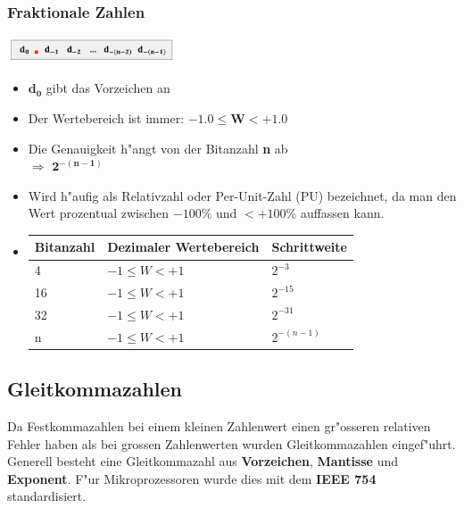 %
\begin{minipage}{0.5cm}
	\ \
\end{minipage}
%
\begin{minipage}[t]{9cm}
	\subsubsection{Fraktionale Zahlen}
		\includegraphics[width=5cm]{pics/Fraktionale_Zahlen}
		\begin{itemize}
			\item $\mathbf{d_0}$ gibt das Vorzeichen an
			\item Der Wertebereich ist immer: \color{blue} $\mathbf{-1.0 \leq W < +1.0}$ \color{black}
			\item Die Genauigkeit h"angt von der Bitanzahl \textbf{n} ab 
				\\$\Rightarrow$ \color{blue} $\mathbf{2^{-(n-1)}}$ \color{black}
			\item Wird h"aufig als Relativzahl oder Per-Unit-Zahl (PU) bezeichnet, da man den Wert prozentual zwischen $-100\%$ und $<+100\%$ auffassen kann.
			\item \begin{tabular}{|l|l|l|}
					\hline
					\rowcolor[HTML]{C0C0C0} 
					Bitanzahl & Dezimaler Wertebereich         & Schrittweite                  \\ \hline
					\rowcolor[HTML]{EFEFEF} 
					4         & $-1 \leq W <+1$ & $2^{-3}$     \\ \hline
					\rowcolor[HTML]{EFEFEF} 
					16        & $-1 \leq W <+1$ & $2^{-15}$    \\ \hline
					\rowcolor[HTML]{EFEFEF} 
					32        & $-1 \leq W <+1$ & $2^{-31}$ \\ \hline
					\rowcolor[HTML]{EFEFEF} 
					n         & $-1 \leq W <+1$ & $2^{-(n-1)}$ \\ \hline		
				\end{tabular}				
		\end{itemize}
\end{minipage}

\subsection{Gleitkommazahlen}
Da Festkommazahlen bei einem kleinen Zahlenwert einen gr"osseren relativen Fehler haben als bei grossen Zahlenwerten wurden Gleitkommazahlen eingef"uhrt. Generell besteht eine Gleitkommazahl aus \textbf{Vorzeichen}, \textbf{Mantisse} und \textbf{Exponent}.
	F"ur Mikroprozessoren wurde dies mit dem \textbf{IEEE 754} standardisiert.
	
